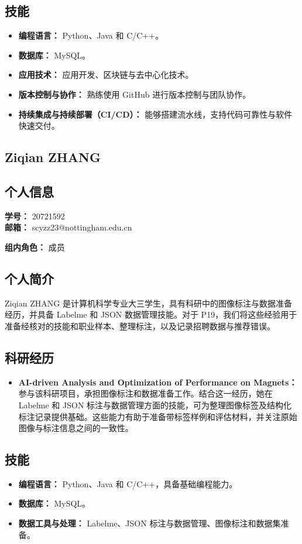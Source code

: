 \documentclass[a4paper,12pt]{article}
\newcommand{\PersonalInformation}[2]{%
  \subsection*{个人信息}
  \if\relax\detokenize{#1}\relax\else
  \noindent\textbf{学号：} #1\\
  \fi
  \textbf{邮箱：} #2\par
}
\begin{document}
\subsection*{技能}
\begin{itemize}
  \item \textbf{编程语言：} Python、Java 和 C/C++。
  \item \textbf{数据库：} MySQL。
  \item \textbf{应用技术：} 应用开发、区块链与去中心化技术。
  \item \textbf{版本控制与协作：} 熟练使用 GitHub 进行版本控制与团队协作。
  \item \textbf{持续集成与持续部署（CI/CD）：} 能够搭建流水线，支持代码可靠性与软件快速交付。
\end{itemize}

\subsection{Ziqian ZHANG}
\PersonalInformation{20721592}{scyzz23@nottingham.edu.cn}
\noindent\textbf{组内角色：} 成员\par

\subsection*{个人简介}
Ziqian ZHANG 是计算机科学专业大三学生，具有科研中的图像标注与数据准备经历，并具备 Labelme 和 JSON 数据管理技能。对于 P19，我们将这些经验用于准备经核对的技能和职业样本、整理标注，以及记录招聘数据与推荐错误。

\subsection*{科研经历}
\begin{itemize}
  \item \textbf{AI-driven Analysis and Optimization of Performance on Magnets：} 参与该科研项目，承担图像标注和数据准备工作。结合这一经历，她在 Labelme 和 JSON 标注与数据管理方面的技能，可为整理图像标签及结构化标注记录提供基础。这些能力有助于准备带标签样例和评估材料，并关注原始图像与标注信息之间的一致性。
\end{itemize}

\subsection*{技能}
\begin{itemize}
  \item \textbf{编程语言：} Python、Java 和 C/C++，具备基础编程能力。
  \item \textbf{数据库：} MySQL。
  \item \textbf{数据工具与处理：} Labelme、JSON 标注与数据管理、图像标注和数据集准备。
\end{itemize}
\end{document}
